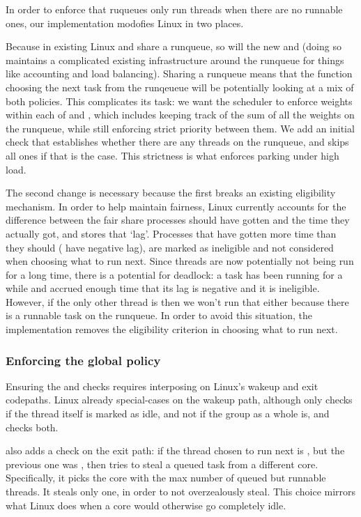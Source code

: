 In order to enforce that ruqueues only run \schedbe{} threads when there are no
runnable \schednormal{} ones, our implementation modofies Linux in two places. 

Because in existing Linux \schedidle{} and \schednormal{} share a runqueue, so
will the new \schedbe{} and \schednormal{} (doing so maintains a complicated
existing infrastructure around the runqueue for things like accounting and load
balancing). Sharing a runqueue means that the function choosing the next task
from the runqeueue will be potentially looking at a mix of both policies. This
complicates its task: we want the scheduler to enforce weights within each of
\schedbe{} and \schednormal{}, which includes keeping track of the sum of all
the weights on the runqueue, while still enforcing strict priority between them.
We add an initial check that establishes whether there are any \schednormal{}
threads on the runqueue, and skips all \schedbe{} ones if that is the case. This
strictness is what enforces parking under high load.

The second change is necessary because the first breaks an existing eligibility
mechanism. In order to help maintain fairness, Linux currently accounts for the
difference between the fair share processes should have gotten and the time they
actually got, and stores that `lag'. Processes that have gotten more time than
they should (\ie{} have negative lag), are marked as ineligible and not
considered when choosing what to run next. Since \schedbe{} threads are now
potentially not being run for a long time, there is a potential for deadlock: a
\schednormal{} task has been running for a while and accrued enough time that
its lag is negative and it is ineligible. However, if the only other thread is
\schedbe{} then we won't run that either because there is a runnable
\schednormal{} task on the runqueue. In order to avoid this situation, the
implementation removes the eligibility criterion in choosing what to run
next.


\subsubsection{Enforcing the global policy}\label{ss:implementation:exit}

Ensuring the \entry{} and \exit{} checks requires interposing on Linux's wakeup
and exit codepaths. Linux already special-cases on the wakeup path, although
only checks if the thread itself is marked as idle, and not if the group as a
whole is, and \schedbe{} checks both.

\schedbe{} also adds a check on the exit path: if the thread chosen to run next
is \schedbe{}, but the previous one was \schednormal{}, then \schedbe{} tries to
steal a queued \schednormal{} task from a different core. Specifically, it picks
the core with the max number of queued but runnable \schednormal{} threads. It
steals only one, in order to not overzealously steal. This choice mirrors what
Linux does when a core would otherwise go completely idle.